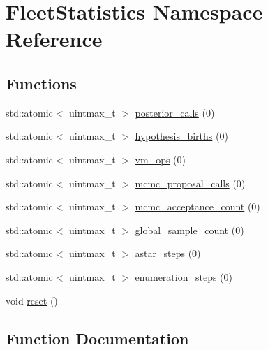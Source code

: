 \hypertarget{namespace_fleet_statistics}{}\section{Fleet\+Statistics Namespace Reference}
\label{namespace_fleet_statistics}
\subsection*{Functions}
\begin{DoxyCompactItemize}
\item 
std\+::atomic$<$ uintmax\+\_\+t $>$ \hyperlink{namespace_fleet_statistics_a6dadb4af01dd69f64cbdf10bdcc3cd68}{posterior\+\_\+calls} (0)
\item 
std\+::atomic$<$ uintmax\+\_\+t $>$ \hyperlink{namespace_fleet_statistics_a1616a32e08aa997f52c5b85a604ef9e5}{hypothesis\+\_\+births} (0)
\item 
std\+::atomic$<$ uintmax\+\_\+t $>$ \hyperlink{namespace_fleet_statistics_ad64460a8eef2b5d661f5cf19a02e9480}{vm\+\_\+ops} (0)
\item 
std\+::atomic$<$ uintmax\+\_\+t $>$ \hyperlink{namespace_fleet_statistics_a1f9e34ed6f510be04fe18bc41d07be49}{mcmc\+\_\+proposal\+\_\+calls} (0)
\item 
std\+::atomic$<$ uintmax\+\_\+t $>$ \hyperlink{namespace_fleet_statistics_ad26d3ef814229c9d5a652a44449bca21}{mcmc\+\_\+acceptance\+\_\+count} (0)
\item 
std\+::atomic$<$ uintmax\+\_\+t $>$ \hyperlink{namespace_fleet_statistics_a52f04256509fd8aa658d16b1bf459060}{global\+\_\+sample\+\_\+count} (0)
\item 
std\+::atomic$<$ uintmax\+\_\+t $>$ \hyperlink{namespace_fleet_statistics_ac5bdb9bf75dd163e4aaf498efe244cf2}{astar\+\_\+steps} (0)
\item 
std\+::atomic$<$ uintmax\+\_\+t $>$ \hyperlink{namespace_fleet_statistics_abc4e1ca48b955eaf7fb6c16d07757023}{enumeration\+\_\+steps} (0)
\item 
void \hyperlink{namespace_fleet_statistics_a84ed12eec0dea83a0b4bba34e2362985}{reset} ()
\end{DoxyCompactItemize}


\subsection{Function Documentation}
\mbox{\label{namespace_fleet_statistics_ac5bdb9bf75dd163e4aaf498efe244cf2}} 
